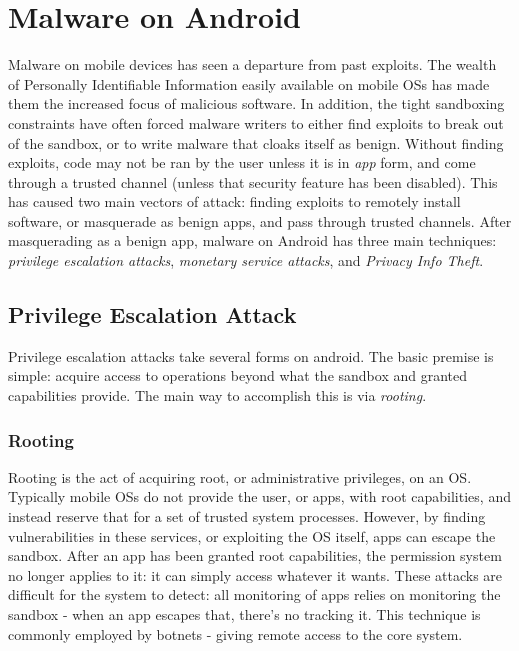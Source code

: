\chapter{Malware on Android}
\label{sec:malware}

Malware on mobile devices has seen a departure from past exploits. The wealth of Personally Identifiable Information easily available on mobile OSs has made them the increased focus of malicious software. In addition, the tight sandboxing constraints have often forced malware writers to either find exploits to break out of the sandbox, or to write malware that cloaks itself as benign. Without finding exploits, code may not be ran by the user unless it is in \textit{app} form, and come through a trusted channel (unless that security feature has been disabled). This has caused two main vectors of attack: finding exploits to remotely install software, or masquerade as benign apps, and pass through trusted channels. After masquerading as a benign app, malware on Android has three main techniques: \textit{privilege escalation attacks}, \textit{monetary service attacks}, and \textit{Privacy Info Theft}. 


\section{Privilege Escalation Attack}
Privilege escalation attacks take several forms on android. The basic premise is simple: acquire access to operations beyond what the sandbox and granted capabilities provide. The main way to accomplish this is via \textit{rooting}.

\subsection{Rooting}
Rooting is the act of acquiring root, or administrative privileges, on an OS. Typically mobile OSs do not provide the user, or apps, with root capabilities, and instead reserve that for a set of trusted system processes. However, by finding vulnerabilities in these services, or exploiting the OS itself, apps can escape the sandbox. After an app has been granted root capabilities, the permission system no longer applies to it: it can simply access whatever it wants. These attacks are difficult for the system to detect: all monitoring of apps relies on monitoring the sandbox - when an app escapes that, there's no tracking it. This technique is commonly employed by botnets - giving remote access to the core system. 


